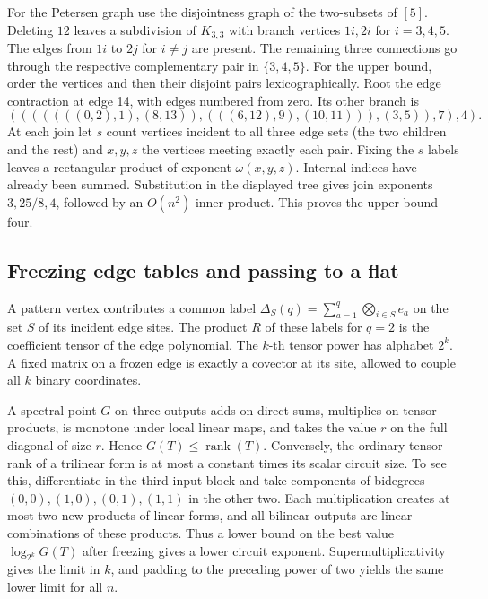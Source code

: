 \documentclass[11pt,letterpaper]{article}
\begin{document}
For the Petersen graph use the disjointness graph of the two-subsets of \([5]\). Deleting \(12\) leaves a subdivision of \(K_{3,3}\) with branch vertices \(1i,2i\) for \(i=3,4,5\). The edges from \(1i\) to \(2j\) for \(i\ne j\) are present. The remaining three connections go through the respective complementary pair in \(\{3,4,5\}\). For the upper bound, order the vertices and then their disjoint pairs lexicographically. Root the edge contraction at edge 14, with edges numbered from zero. Its other branch is
\[
 (((((((0,2),1),(8,13)),(((6,12),9),(10,11))),(3,5)),7),4).
\]
At each join let \(s\) count vertices incident to all three edge sets (the two children and the rest) and \(x,y,z\) the vertices meeting exactly each pair. Fixing the \(s\) labels leaves a rectangular product of exponent \(\omega(x,y,z)\). Internal indices have already been summed. Substitution in the displayed tree gives join exponents \(3,25/8,4\), followed by an \(O(n^2)\) inner product. This proves the upper bound four.

\subsection{Freezing edge tables and passing to a flat}\label{freezing-edge-tables-and-passing-to-a-flat}

A pattern vertex contributes a common label \(\Delta_S(q)=\sum_{a=1}^q\bigotimes_{i\in S} e_a\) on the set \(S\) of its incident edge sites. The product \(R\) of these labels for \(q=2\) is the coefficient tensor of the edge polynomial. The \(k\)-th tensor power has alphabet \(2^k\). A fixed matrix on a frozen edge is exactly a covector at its site, allowed to couple all \(k\) binary coordinates.

A spectral point \(G\) on three outputs adds on direct sums, multiplies on tensor products, is monotone under local linear maps, and takes the value \(r\) on the full diagonal of size \(r\). Hence \(G(T)\le\operatorname{rank}(T)\). Conversely, the ordinary tensor rank of a trilinear form is at most a constant times its scalar circuit size. To see this, differentiate in the third input block and take components of bidegrees \((0,0),(1,0),(0,1),(1,1)\) in the other two. Each multiplication creates at most two new products of linear forms, and all bilinear outputs are linear combinations of these products. Thus a lower bound on the best value \(\log_{2^k}G(T)\) after freezing gives a lower circuit exponent. Supermultiplicativity gives the limit in \(k\), and padding to the preceding power of two yields the same lower limit for all \(n\).
\end{document}
